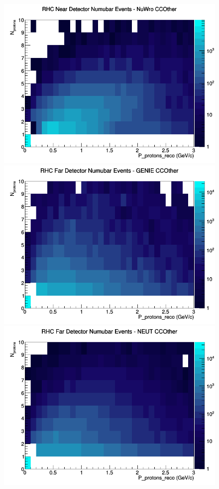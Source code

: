 \documentclass[12pt]{article}
\begin{document}
\begin{figure}[h]
\includegraphics[width=\linewidth]{eff_N_P/FGT/protons/CCOther_RHC_ND_numubar_N_P_NuWro.png}
\endminipage
\newline
{}
\includegraphics[width=\linewidth]{eff_N_P/FGT/protons/CCOther_RHC_FD_numubar_N_P_GENIE.png}
\endminipage
{}
\includegraphics[width=\linewidth]{eff_N_P/FGT/protons/CCOther_RHC_FD_numubar_N_P_NEUT.png}

\end{figure}
\end{document}
